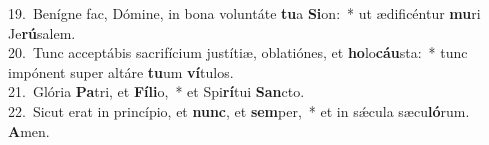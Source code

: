 {19.~}Benígne fac, Dómine, in bona voluntáte \textbf{tu}a \textbf{Si}on:~* ut ædificéntur \textbf{mu}ri Je\textbf{rú}salem.\\
{20.~}Tunc acceptábis sacrifícium justítiæ, oblatiónes, et \textbf{ho}lo\textbf{cáu}sta:~* tunc impónent super altáre \textbf{tu}um \textbf{ví}tulos.\\
{21.~}Glória \textbf{Pa}tri, et \textbf{Fí}\textbf{li}o,~* et Spi\textbf{rí}tui \textbf{San}cto.\\
{22.~}Sicut erat in princípio, et \textbf{nunc}, et \textbf{sem}per,~* et in sǽcula sæcu\textbf{ló}rum. \textbf{A}men.\\

